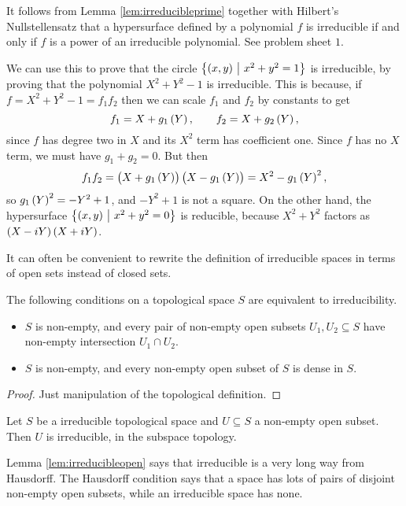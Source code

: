 It follows from Lemma \ref{lem:irreducibleprime} together with Hilbert's Nullstellensatz that a hypersurface defined by a polynomial $ f $ is irreducible if and only if $ f $ is a power of an irreducible polynomial. See problem sheet $ 1 $.

\begin{example*}
We can use this to prove that the circle $ \cbr{\br{x, y} \st x^2 + y^2 = 1} $ is irreducible, by proving that the polynomial $ X^2 + Y^2 - 1 $ is irreducible. This is because, if $ f = X^2 + Y^2 - 1 = f_1f_2 $ then we can scale $ f_1 $ and $ f_2 $ by constants to get
$$ f_1 = X + g_1\br{Y}, \qquad f_2 = X + g_2\br{Y}, $$
since $ f $ has degree two in $ X $ and its $ X^2 $ term has coefficient one. Since $ f $ has no $ X $ term, we must have $ g_1 + g_2 = 0 $. But then
$$ f_1f_2 = \br{X + g_1\br{Y}}\br{X - g_1\br{Y}} = X^2 - g_1\br{Y}^2, $$
so $ g_1\br{Y}^2 = -Y^2 + 1 $, and $ -Y^2 + 1 $ is not a square. On the other hand, the hypersurface $ \cbr{\br{x, y} \st x^2 + y^2 = 0} $ is reducible, because $ X^2 + Y^2 $ factors as $ \br{X - iY}\br{X + iY} $.
\end{example*}

It can often be convenient to rewrite the definition of irreducible spaces in terms of open sets instead of closed sets.

\begin{lemma}
\label{lem:irreducibleopen}
The following conditions on a topological space $ S $ are equivalent to irreducibility.
\begin{itemize}
\item $ S $ is non-empty, and every pair of non-empty open subsets $ U_1, U_2 \subseteq S $ have non-empty intersection $ U_1 \cap U_2 $.
\item $ S $ is non-empty, and every non-empty open subset of $ S $ is dense in $ S $.
\end{itemize}
\end{lemma}

\begin{proof}
Just manipulation of the topological definition.
\end{proof}

\begin{corollary}
\label{cor:irreducibleopen}
Let $ S $ be a irreducible topological space and $ U \subseteq S $ a non-empty open subset. Then $ U $ is irreducible, in the subspace topology.
\end{corollary}

Lemma \ref{lem:irreducibleopen} says that irreducible is a very long way from Hausdorff. The Hausdorff condition says that a space has lots of pairs of disjoint non-empty open subsets, while an irreducible space has none.

